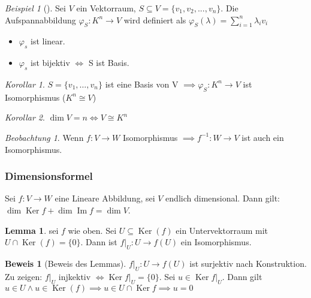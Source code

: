 \documentclass[11pt]{article}
\DeclareMathOperator{\mdim}{dim}
\DeclareMathOperator{\mKer}{Ker}
\DeclareMathOperator{\mIm}{Im}
\theoremstyle{remark}
\newtheorem{exa}{Beispiel}[section]
\newtheorem{beobachtung}{Beobachtung}
\theoremstyle{definition}
\newtheorem{prof}{Beweis}
\newtheorem*{lemma}{Lemma}
\theoremstyle{remark}
\newtheorem*{korollar}{Korollar}
\begin{document}
\begin{exa}[] \label{}
Sei \(V\) ein Vektorraum, \(S\subseteq V = \{v_1, v_2, ..., v_n\}\). Die
Aufspannabbildung $\varphi_S: K^n \rightarrow V$ wird definiert als $\varphi_S(\lambda)=\sum_{i=1}^{n}\lambda_i v_i$

\begin{itemize}
	\item \(\varphi_s\) ist linear.
	\item \(\varphi_s\) ist bijektiv \(\iff\) S ist Basis.
\end{itemize}
\end{exa}

\begin{korollar}
	\(S=\{v_1,\ldots,v_n\}\) ist eine Basis von V $\implies \varphi_S: K^n \rightarrow V$ ist Isomorphismus ($K^n\cong V$)
\end{korollar}

\begin{korollar}
	\(\dim V = n \iff V\cong K^n\)
\end{korollar}

\begin{beobachtung}
	Wenn \(f:V\rightarrow W\) Isomorphismus $\implies f^{-1}:W\rightarrow V $ ist auch ein Isomorphismus.
\end{beobachtung}

\subsubsection{Dimensionsformel}
\label{sec:org9a58004}
\begin{theo}{}{}
Sei \(f:V\to W\) eine Lineare Abbildung, sei \(V\) endlich dimensional. Dann gilt: \(\mdim\mKer f + \mdim\mIm f = \mdim V\).
\end{theo}

\begin{lemma} sei \(f\) wie oben. Sei \(U \subseteq \mKer(f)\) ein Untervektorraum mit \(U \cap \mKer(f) = \{0\}\).  Dann ist \(f|_U:U\to f(U)\) ein Isomorphismus.
\end{lemma}

\begin{prof}[Beweis des Lemmas] \label{}
\(f|_U:U\to f(U)\) ist surjektiv nach Konstruktion. Zu zeigen: \(f|_U\) injkektiv \(\iff \mKer f|_U = \{0\}\). Sei \(u\in \mKer f|_U \). Dann gilt \(u\in U \land u \in \mKer(f) \implies u \in U \cap \mKer f \implies u = 0\)
\end{prof}
\end{document}
